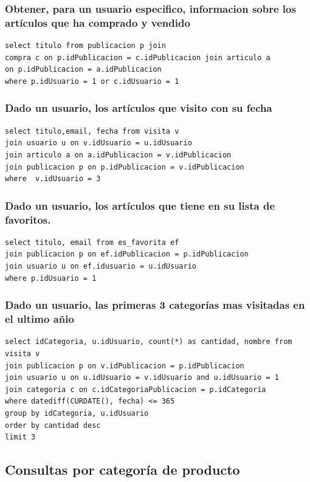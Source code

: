 \documentclass[a4paper, 10pt, twoside]{article}
\begin{document}
\subsubsection{Obtener, para un usuario especifico, informacion sobre los art\'iculos que ha comprado y vendido}
\begin{verbatim}
select titulo from publicacion p join 
compra c on p.idPublicacion = c.idPublicacion join articulo a 
on p.idPublicacion = a.idPublicacion 
where p.idUsuario = 1 or c.idUsuario = 1 
\end{verbatim}


\subsubsection{Dado un usuario, los art\'iculos que visito con su fecha}
\begin{verbatim}
select titulo,email, fecha from visita v 
join usuario u on v.idUsuario = u.idUsuario 
join articulo a on a.idPublicacion = v.idPublicacion 
join publicacion p on p.idPublicacion = v.idPublicacion 
where  v.idUsuario = 3
\end{verbatim}

\subsubsection{Dado un usuario, los art\'iculos que tiene en su lista de favoritos.}
\begin{verbatim}
select titulo, email from es_favorita ef 
join publicacion p on ef.idPublicacion = p.idPublicacion 
join usuario u on ef.idusuario = u.idUsuario  
where p.idUsuario = 1
\end{verbatim}

\subsubsection{Dado un usuario, las primeras 3 categor\'ias mas visitadas en el ultimo a\~nio}
\begin{verbatim}
select idCategoria, u.idUsuario, count(*) as cantidad, nombre from visita v 
join publicacion p on v.idPublicacion = p.idPublicacion 
join usuario u on u.idUsuario = v.idUsuario and u.idUsuario = 1
join categoria c on c.idCategoriaPublicacion = p.idCategoria
where datediff(CURDATE(), fecha) <= 365 
group by idCategoria, u.idUsuario
order by cantidad desc
limit 3
\end{verbatim}
\newpage
\subsection{Consultas por categor\'ia de producto}
\end{document}
